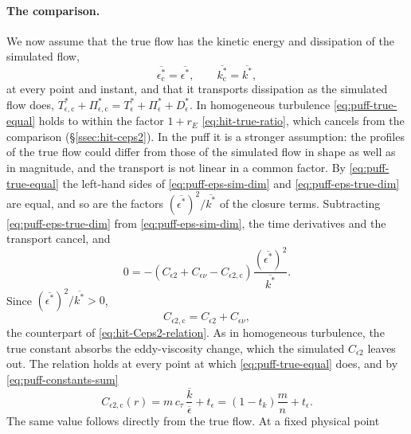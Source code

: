 \documentclass{article}
\begin{document}
\paragraph{The comparison.}
We now assume that the true flow has the kinetic energy and dissipation of the
simulated flow,
\begin{equation}\label{eq:puff-true-equal}
  \overline{\epsilon_{\mathrm{c}}^*} = \overline{\epsilon^*} ,
  \qquad
  \overline{k_{\mathrm{c}}^*} = \overline{k^*} ,
\end{equation}
at every point and instant, and that it transports dissipation as the
simulated flow does,
$T_{\epsilon,\mathrm{c}}^* + \Pi_{\epsilon,\mathrm{c}}^* = T_\epsilon^* + \Pi_\epsilon^* + D_\epsilon^*$.
In homogeneous turbulence \eqref{eq:puff-true-equal} holds to within the
factor $1 + r_E$ \eqref{eq:hit-true-ratio}, which cancels from the
comparison (\S\ref{ssec:hit-ceps2}). In the puff it is a stronger
assumption: the profiles of the true flow could differ from those of the
simulated flow in shape as well as in magnitude, and the transport is not
linear in a common factor. By \eqref{eq:puff-true-equal} the
left-hand sides of \eqref{eq:puff-eps-sim-dim} and
\eqref{eq:puff-eps-true-dim} are equal, and so are the factors
$(\overline{\epsilon^*})^2/\overline{k^*}$ of the closure terms. Subtracting
\eqref{eq:puff-eps-true-dim} from \eqref{eq:puff-eps-sim-dim}, the time
derivatives and the transport cancel, and
\begin{equation*}
  0 = - \left( C_{\epsilon 2} + C_{\epsilon\nu} - C_{\epsilon 2,\mathrm{c}} \right) \frac{\left(\overline{\epsilon^*}\right)^2}{\overline{k^*}} .
\end{equation*}
Since $(\overline{\epsilon^*})^2/\overline{k^*} > 0$,
\begin{equation}\label{eq:puff-Ceps2c-relation}
  C_{\epsilon 2,\mathrm{c}} = C_{\epsilon 2} + C_{\epsilon\nu} ,
\end{equation}
the counterpart of \eqref{eq:hit-Ceps2-relation}. As in homogeneous
turbulence, the true constant absorbs the eddy-viscosity change, which the
simulated $C_{\epsilon 2}$ leaves out. The relation holds at every point at
which \eqref{eq:puff-true-equal} does, and by \eqref{eq:puff-constants-sum}
\begin{equation}\label{eq:puff-Ceps2c}
  C_{\epsilon 2,\mathrm{c}}(r)
  = m\, c_\tau\, \frac{\overline{k}}{\overline{\epsilon}} + t_\epsilon
  = \left( 1 - t_k \right) \frac{m}{n} + t_\epsilon .
\end{equation}
The same value follows directly from the true flow. At a fixed physical point
\end{document}
